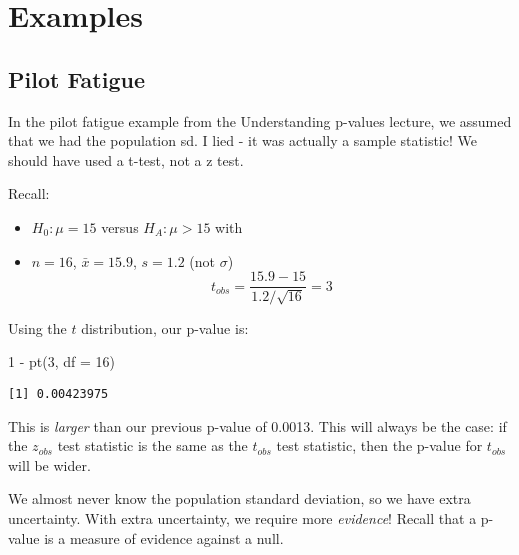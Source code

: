 \documentclass[
  letterpaper,
  DIV=11,
  numbers=noendperiod]{scrreprt}
\newenvironment{Shaded}{\begin{snugshade}}{\end{snugshade}}
\newcommand{\AttributeTok}[1]{\textcolor[rgb]{0.40,0.45,0.13}{#1}}
\newcommand{\DecValTok}[1]{\textcolor[rgb]{0.68,0.00,0.00}{#1}}
\newcommand{\FunctionTok}[1]{\textcolor[rgb]{0.28,0.35,0.67}{#1}}
\newcommand{\NormalTok}[1]{\textcolor[rgb]{0.00,0.23,0.31}{#1}}
\newcommand{\SpecialCharTok}[1]{\textcolor[rgb]{0.37,0.37,0.37}{#1}}
\providecommand{\tightlist}{%
  \setlength{\itemsep}{0pt}\setlength{\parskip}{0pt}}\usepackage{longtable,booktabs,array}
\begin{document}
\hypertarget{examples-6}{%
\section{Examples}\label{examples-6}}

\hypertarget{pilot-fatigue}{%
\subsection{Pilot Fatigue}\label{pilot-fatigue}}

In the pilot fatigue example from the Understanding p-values lecture, we
assumed that we had the population sd. I lied - it was actually a sample
statistic! We should have used a t-test, not a z test.

Recall:

\begin{itemize}
\tightlist
\item
  \(H_0: \mu = 15\) versus \(H_A: \mu > 15\) with
\item
  \(n = 16\), \(\bar x = 15.9\), \(s = 1.2\) (not \(\sigma\)) \[
  t_{obs} = \frac{15.9 - 15}{1.2/\sqrt{16}} = 3
  \]
\end{itemize}

Using the \(t\) distribution, our p-value is:

\begin{Shaded}
\begin{Highlighting}[]
\DecValTok{1} \SpecialCharTok{{-}} \FunctionTok{pt}\NormalTok{(}\DecValTok{3}\NormalTok{, }\AttributeTok{df =} \DecValTok{16}\NormalTok{)}
\end{Highlighting}
\end{Shaded}

\begin{verbatim}
[1] 0.00423975
\end{verbatim}

This is \emph{larger} than our previous p-value of 0.0013. This will
always be the case: if the \(z_{obs}\) test statistic is the same as the
\(t_{obs}\) test statistic, then the p-value for \(t_{obs}\) will be
wider.

\begin{tcolorbox}[enhanced jigsaw, toptitle=1mm, colbacktitle=quarto-callout-warning-color!10!white, breakable, leftrule=.75mm, left=2mm, opacityback=0, colframe=quarto-callout-warning-color-frame, rightrule=.15mm, toprule=.15mm, bottomtitle=1mm, titlerule=0mm, title=\textcolor{quarto-callout-warning-color}{\faExclamationTriangle}\hspace{0.5em}{p-values from a t-test are larger than a z-test (if you have
\(\sigma=s\))}, arc=.35mm, colback=white, bottomrule=.15mm, opacitybacktitle=0.6, coltitle=black]

We almost never know the population standard deviation, so we have extra
uncertainty. With extra uncertainty, we require more \emph{evidence}!
Recall that a p-value is a measure of evidence against a null.

\end{tcolorbox}
\end{document}
